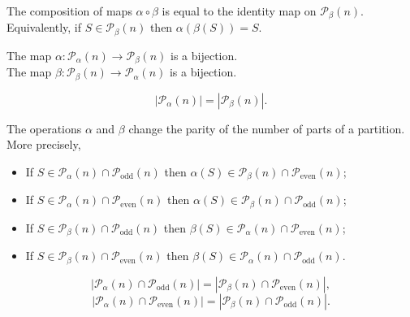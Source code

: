 \begin{lemma}
  The composition of maps $\alpha\circ\beta$ is equal to the identity map on  $\mathcal{P}_\beta(n)$. Equivalently, if $S\in \mathcal{P}_\beta(n)$ then $\alpha(\beta(S))=S$.
\end{lemma}

\begin{lemma}
The map $\alpha: \mathcal{P}_\alpha(n)\to \mathcal{P}_\beta(n)$ is a bijection. \\
The map $\beta: \mathcal{P}_\beta(n)\to \mathcal{P}_\alpha(n)$ is a bijection.
\end{lemma}

\begin{lemma}
$$\left| \mathcal{P}_\alpha(n)\right|=\left|\mathcal{P}_\beta(n) \right|.$$
\end{lemma}

\begin{lemma}
The operations $\alpha$ and $\beta$ change the parity of the number of parts of a partition. More precisely,
\begin{itemize}
\item If $S\in \mathcal{P}_\alpha(n)\cap\mathcal{P}_{\mathrm{odd}}(n) $ then  $\alpha(S) \in \mathcal{P}_\beta(n)\cap\mathcal{P}_{\mathrm{even}}(n) $;
\item If $S\in \mathcal{P}_\alpha(n)\cap\mathcal{P}_{\mathrm{even}}(n) $ then  $\alpha(S) \in \mathcal{P}_\beta(n)\cap\mathcal{P}_{\mathrm{odd}}(n) $;
\item If $S\in \mathcal{P}_\beta(n)\cap\mathcal{P}_{\mathrm{odd}}(n) $ then  $\beta(S) \in \mathcal{P}_\alpha(n)\cap\mathcal{P}_{\mathrm{even}}(n) $;
\item If $S\in \mathcal{P}_\beta(n)\cap\mathcal{P}_{\mathrm{even}}(n) $ then  $\beta(S) \in \mathcal{P}_\alpha(n)\cap\mathcal{P}_{\mathrm{odd}}(n) $.
\end{itemize}
\end{lemma}

\begin{lemma}\label{lemma: alpha odd eq beta even}
$$\left| \mathcal{P}_\alpha(n)\cap \mathcal{P}_{\mathrm{odd}}(n)\right|=\left| \mathcal{P}_\beta(n)\cap \mathcal{P}_{\mathrm{even}}(n)\right|,$$
$$\left| \mathcal{P}_\alpha(n)\cap \mathcal{P}_{\mathrm{even}}(n)\right|=\left| \mathcal{P}_\beta(n)\cap \mathcal{P}_{\mathrm{odd}}(n)\right|.$$
\end{lemma}




